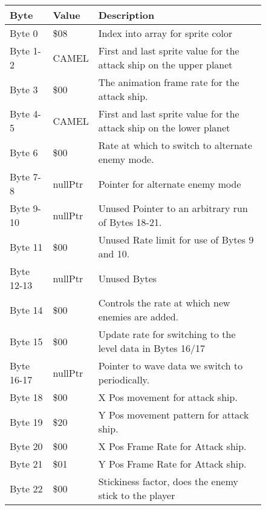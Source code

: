 \begin{figure}[H]
{\begin{adjustbox}{width=12cm}
\begin{tabular}{lll}
\toprule
 Byte       & Value              & Description                                                         \\
\midrule
 Byte 0     & \$08                & Index into array for sprite color                                   \\
 Byte 1-2   & CAMEL              & First and last sprite value for the attack ship on the upper planet \\
 Byte 3     & \$00                & The animation frame rate for the attack ship.                       \\
 Byte 4-5   & CAMEL              & First and last sprite value for the attack ship on the lower planet \\
 Byte 6     & \$00                & Rate at which to switch to alternate enemy mode.                    \\
 Byte 7-8   & nullPtr            & Pointer for alternate enemy mode                                    \\
 Byte 9-10  & nullPtr            & Unused Pointer to an arbitrary run of Bytes 18-21.                  \\
 Byte 11    & \$00                & Unused Rate limit for use of Bytes 9 and 10.                        \\
 Byte 12-13 & nullPtr            & Unused Bytes                                                        \\
 Byte 14    & \$00                & Controls the rate at which new enemies are added.                   \\
 Byte 15    & \$00                & Update rate for switching to the level data in Bytes 16/17          \\
 Byte 16-17 & nullPtr            & Pointer to wave data we switch to periodically.                     \\
 Byte 18    & \$00                & X Pos movement for attack ship.                                     \\
 Byte 19    & \$20                & Y Pos movement pattern for attack ship.                             \\
 Byte 20    & \$00                & X Pos Frame Rate for Attack ship.                                   \\
 Byte 21    & \$01                & Y Pos Frame Rate for Attack ship.                                   \\
 Byte 22    & \$00                & Stickiness factor, does the enemy stick to the player               \\

\end{tabular}
\end{adjustbox}}
\end{figure}
